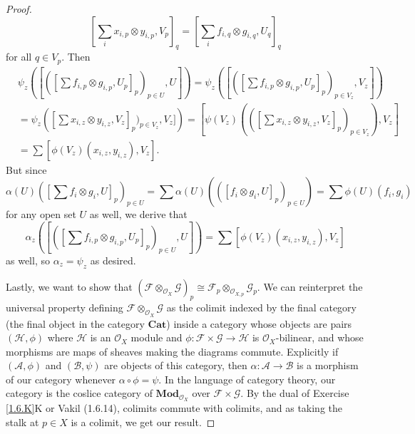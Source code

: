 \documentclass{article}
\newcommand{\fA}{\mathscr{A}}
\newcommand{\fB}{\mathscr{B}}
\newcommand{\fF}{\mathscr{F}}
\newcommand{\fG}{\mathscr{G}}
\newcommand{\fH}{\mathscr{H}}
\newcommand{\fO}{\mathscr{O}}
\newcommand{\Mod}{\mathbf{Mod}} %
\newcommand{\Cat}{\mathbf{Cat}} %
\begin{document}
\begin{proof}
    \[
    [\sum_i x_{i,p}\otimes y_{i,p}, V_p]_q=[\sum_i f_{i,q}\otimes g_{i,q},U_q]_q
    \]
    for all $q\in V_p$. Then
    \begin{align*}
        &\psi_z\left([([\sum f_{i,p}\otimes g_{i,p},U_p]_p)_{p\in U},U]\right)= \psi_z\left([([\sum f_{i,p}\otimes g_{i,p},U_p]_p)_{p\in V_z},V_z]\right)\\
        &=\psi_z\left([\sum x_{i,z}\otimes y_{i,z}, V_z]_p)_{p\in V_z},V_z]\right)=[\psi(V_z)\left(([\sum x_{i,z}\otimes y_{i,z}, V_z]_p)_{p\in V_z}\right),V_z]\\
        &= \sum[ \phi(V_z)(x_{i,z}, y_{i,z}), V_z].
    \end{align*}
    But since
    \[
     \alpha(U)([\sum f_i\otimes g_i, U]_p)_{p\in U}=\sum \alpha(U)\left(([f_i\otimes g_i, U]_p)_{p\in U}\right)=\sum \phi(U)(f_i,g_i)
    \]
    for any open set $U$ as well, we derive that 
    \[
    \alpha_z\left([([\sum f_{i,p}\otimes g_{i,p},U_p]_p)_{p\in U},U]\right)=\sum[ \phi(V_z)(x_{i,z}, y_{i,z}), V_z]
    \]
    as well, so $\alpha_z=\psi_z$ as desired.
    
    Lastly, we want to show that $(\fF \otimes_{\fO_X} \fG)_p \cong \fF_p \otimes_{\fO_{X,p}} \fG_p$. We can reinterpret the universal property defining $\fF \otimes_{\fO_X} \fG$ as the colimit indexed by the final category (the final object in the category $\Cat$) inside a category whose objects are pairs $(\fH, \phi)$ where $\fH$ is an $\fO_X$ module and $\phi:\fF\times \fG \to \fH$ is $\fO_X$-bilinear, and whose morphisms are maps of sheaves making the diagrams commute. Explicitly if $(\fA, \phi)$ and $(\fB, \psi)$ are objects of this category, then $\alpha:\fA \to \fB$ is a morphism of our category whenever $\alpha \circ \phi = \psi$. In the language of category theory, our category is the coslice category of  $\Mod_{\fO_X}$ over $\fF\times \fG$. By the dual of Exercise \ref{1.6.K}K or Vakil (1.6.14), colimits commute with colimits, and as taking the stalk at $p\in X$ is a colimit, we get our result.
\end{proof}
\subsection{}
\end{document}
